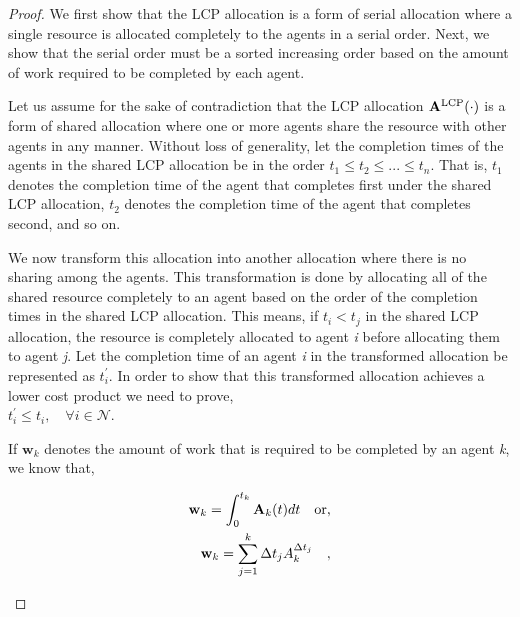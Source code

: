 \documentclass[letterpaper]{article} %
\theoremstyle{definition}
\begin{document}
\begin{proof}
We first show that the LCP allocation is a form of serial allocation where a single resource is allocated completely to the agents in a serial order. Next, we show that the serial order must be a sorted increasing order based on the amount of work required to be completed by each agent.

Let us assume for the sake of contradiction that the LCP allocation $\mathbf{A}^{\textnormal{LCP}}(\cdot)$ is a form of shared allocation where one or more agents share the resource with other agents in any manner. Without loss of generality, let the completion times of the agents in the shared LCP allocation be in the order $t_{1} \leq t_{2} \leq ... \leq t_{n}$. That is, $t_{1}$ denotes the completion time of the agent that completes first under the shared LCP allocation, $t_{2}$ denotes the completion time of the agent that completes second, and so on.

We now transform this allocation into another allocation where there is no sharing among the agents. This transformation is done by allocating all of the shared resource completely to an agent based on the order of the completion times in the shared LCP allocation. This means, if $t_{i} < t_{j}$ in the shared LCP allocation, the resource is completely allocated to agent \textit{i} before allocating them to agent \textit{j}. Let the completion time of an agent \textit{i} in the transformed allocation be represented as $t^{'}_{i}$. In order to show that this transformed allocation achieves a lower cost product we need to prove,
\\$t^{'}_{i} \leq t_{i}, \quad \forall i \in \mathcal{N}$.

If $\mathbf{w}_{k}$ denotes the amount of work that is required to be completed by an agent \textit{k}, we know that,
\begin{linenomath}
\begin{equation*}
\begin{split}
\mathbf{w}_{k} = \displaystyle \int^{t_{k}}_{0} \mathbf{A}_{k}(t)dt \quad \textnormal{or,}\\
\mathbf{w}_{k} = \displaystyle \sum^{k}_{j = 1} \Delta t_{j} A^{\Delta t_{j}}_{k} \quad,
\end{split}    
\end{equation*}
\end{linenomath}


\end{proof}
\end{document}
